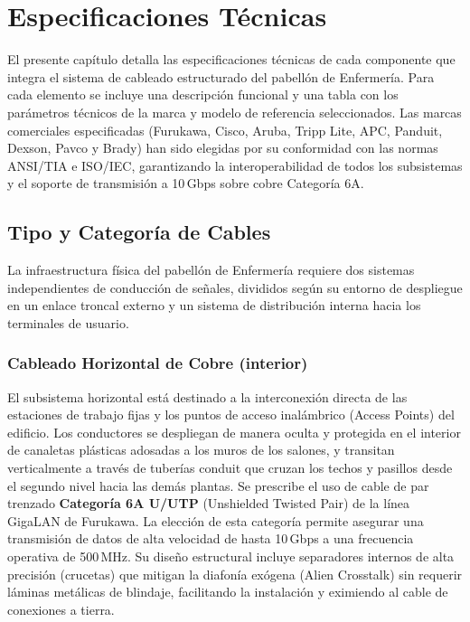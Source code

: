 \chapter{Especificaciones Técnicas}

El presente capítulo detalla las especificaciones técnicas de cada componente que integra el sistema de cableado estructurado del pabellón de Enfermería. Para cada elemento se incluye una descripción funcional y una tabla con los parámetros técnicos de la marca y modelo de referencia seleccionados. Las marcas comerciales especificadas (Furukawa, Cisco, Aruba, Tripp Lite, APC, Panduit, Dexson, Pavco y Brady) han sido elegidas por su conformidad con las normas ANSI/TIA e ISO/IEC, garantizando la interoperabilidad de todos los subsistemas y el soporte de transmisión a 10\,Gbps sobre cobre Categoría 6A.

\section{Tipo y Categoría de Cables}
La infraestructura física del pabellón de Enfermería requiere dos sistemas independientes de conducción de señales, divididos según su entorno de despliegue en un enlace troncal externo y un sistema de distribución interna hacia los terminales de usuario.

\subsection{Cableado Horizontal de Cobre (interior)}
El subsistema horizontal está destinado a la interconexión directa de las estaciones de trabajo fijas y los puntos de acceso inalámbrico (Access Points) del edificio.
Los conductores se despliegan de manera oculta y protegida en el interior de canaletas plásticas adosadas a los muros de los salones, y transitan verticalmente a través de tuberías conduit que cruzan los techos y pasillos desde el segundo nivel hacia las demás plantas.
Se prescribe el uso de cable de par trenzado \textbf{Categoría 6A U/UTP} (Unshielded Twisted Pair) de la línea GigaLAN de Furukawa.
La elección de esta categoría permite asegurar una transmisión de datos de alta velocidad de hasta 10\,Gbps a una frecuencia operativa de 500\,MHz. Su diseño estructural incluye separadores internos de alta precisión (crucetas) que mitigan la diafonía exógena (Alien Crosstalk) sin requerir láminas metálicas de blindaje, facilitando la instalación y eximiendo al cable de conexiones a tierra.

